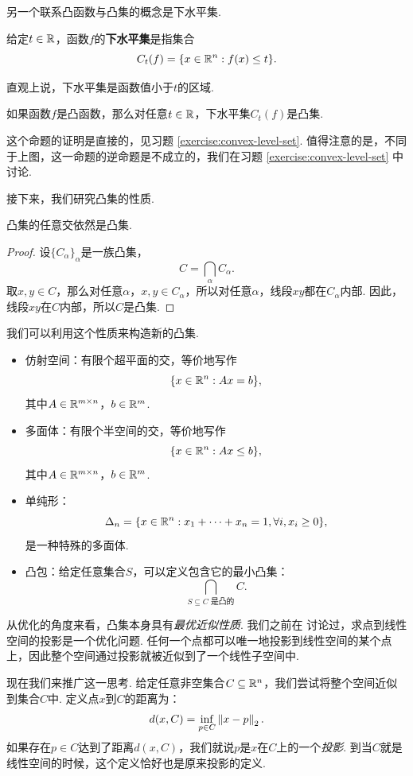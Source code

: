 另一个联系凸函数与凸集的概念是下水平集. 
\begin{definition}[下水平集]
    给定$t\in\mathbb{R}$，函数$f$的\textbf{下水平集}是指集合
    \[C_t(f)=\{x\in\mathbb{R}^n:f(x)\leq t\}.\]
\end{definition}
直观上说，下水平集是函数值小于$t$的区域.

\begin{proposition}\label{proposition:level-set}
    如果函数$f$是凸函数，那么对任意$t\in\mathbb{R}$，下水平集$C_t(f)$是凸集.
\end{proposition}
这个命题的证明是直接的，见习题 \ref{exercise:convex-level-set}. 值得注意的是，不同于上图，这一命题的逆命题是不成立的，我们在习题 \ref{exercise:convex-level-set} 中讨论. 

接下来，我们研究凸集的性质.

\begin{proposition}\label{proposition:convex-set-intersect}
    凸集的任意交依然是凸集.
\end{proposition}
\begin{proof}
    设$\{C_\alpha\}_\alpha$是一族凸集，
    \[C=\bigcap_\alpha C_\alpha.\]
    取$x,y\in C$，那么对任意$\alpha$，$x,y\in C_\alpha$，所以对任意$\alpha$，线段$xy$都在$C_\alpha$内部. 因此，线段$xy$在$C$内部，所以$C$是凸集.
\end{proof}

我们可以利用这个性质来构造新的凸集.
\begin{example}
\begin{itemize}
    \item 仿射空间：有限个超平面的交，等价地写作
    \[\{x\in\mathbb{R}^n:Ax=b\},\]
    其中$A\in\mathbb{R}^{m\times n}$，$b\in\mathbb{R}^m$.
    \item 多面体：有限个半空间的交，等价地写作
    \[\{x\in\mathbb{R}^n:Ax\leq b\},\]
    其中$A\in\mathbb{R}^{m\times n}$，$b\in\mathbb{R}^m$.
    \item 单纯形：
    \[\Delta_n=\{x\in\mathbb{R}^n:x_1+\dots+x_n=1,\forall i,x_i\geq 0\},\]
    是一种特殊的多面体.
    \item 凸包：给定任意集合$S$，可以定义包含它的最小凸集：
    \[\bigcap_{S\subseteq C\text{ 是凸的}} C.\]
\end{itemize}
\end{example}

从优化的角度来看，凸集本身具有\textit{最优近似性质}. 我们之前在 讨论过，求点到线性空间的投影是一个优化问题. 任何一个点都可以唯一地投影到线性空间的某个点上，因此整个空间通过投影就被近似到了一个线性子空间中. 

现在我们来推广这一思考. 给定任意非空集合$C\subseteq\mathbb{R}^n$，我们尝试将整个空间近似到集合$C$中. 定义点$x$到$C$的距离为：
\[d(x,C)=\inf_{p\in C}\left\|x-p\right\|_2.\]
如果存在$p\in C$达到了距离$d(x,C)$，我们就说$p$是$x$在$C$上的一个\textit{投影}. 到当$C$就是线性空间的时候，这个定义恰好也是原来投影的定义.

